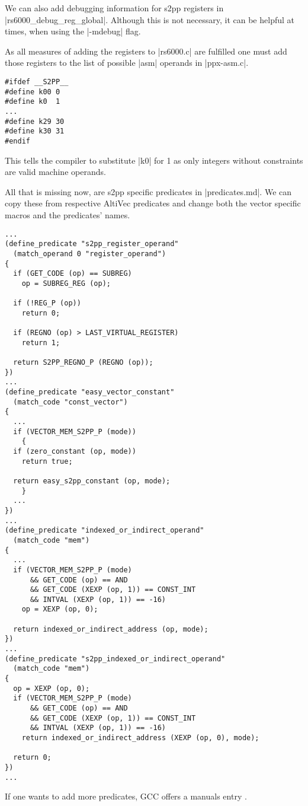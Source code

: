 We can also add debugging information for s2pp registers in |rs6000_debug_reg_global|.
Although this is not necessary, it can be helpful at times, when using the |-mdebug| flag.

As all measures of adding the registers to |rs6000.c| are fulfilled one must add those registers to the list of possible |asm| operands in |ppx-asm.c|.
\begin{lstlisting}
#ifdef __S2PP__
#define k00 0
#define k0  1
...
#define k29 30
#define k30 31
#endif
\end{lstlisting}
This tells the compiler to substitute |k0| for 1 as only integers without constraints are valid machine operands.

All that is missing now, are s2pp specific predicates in |predicates.md|.
We can copy these from respective AltiVec predicates and change both the vector specific macros and the predicates' names.
\begin{lstlisting}
...
(define_predicate "s2pp_register_operand"
  (match_operand 0 "register_operand")
{
  if (GET_CODE (op) == SUBREG)
    op = SUBREG_REG (op);

  if (!REG_P (op))
    return 0;

  if (REGNO (op) > LAST_VIRTUAL_REGISTER)
    return 1;

  return S2PP_REGNO_P (REGNO (op));
})
...
(define_predicate "easy_vector_constant"
  (match_code "const_vector")
{
  ...
  if (VECTOR_MEM_S2PP_P (mode))
    {
  if (zero_constant (op, mode))
    return true;

  return easy_s2pp_constant (op, mode);
    }
  ...
})
...
(define_predicate "indexed_or_indirect_operand"
  (match_code "mem")
{
  ...
  if (VECTOR_MEM_S2PP_P (mode)
      && GET_CODE (op) == AND
      && GET_CODE (XEXP (op, 1)) == CONST_INT
      && INTVAL (XEXP (op, 1)) == -16)
    op = XEXP (op, 0);

  return indexed_or_indirect_address (op, mode);
})
...
(define_predicate "s2pp_indexed_or_indirect_operand"
  (match_code "mem")
{
  op = XEXP (op, 0);
  if (VECTOR_MEM_S2PP_P (mode)
      && GET_CODE (op) == AND
      && GET_CODE (XEXP (op, 1)) == CONST_INT
      && INTVAL (XEXP (op, 1)) == -16)
    return indexed_or_indirect_address (XEXP (op, 0), mode);

  return 0;
})
...    
\end{lstlisting}
If one wants to add more predicates, GCC offers a manuals entry \citep[ch.~16.7]{GCCint}.

